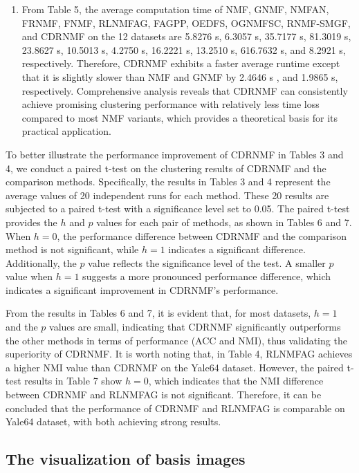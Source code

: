 \documentclass[a4paper,fleqn]{cas-sc}
\begin{document}
\begin{enumerate}[(1)]
	\item From Table 5, the average computation time of NMF, GNMF, NMFAN, FRNMF, FNMF, RLNMFAG, FAGPP, OEDFS, OGNMFSC, RNMF-SMGF, and CDRNMF on the 12 datasets are 5.8276 s, 6.3057 s, 35.7177 s, 81.3019 s, 23.8627 s, 10.5013 s, 4.2750 s, 16.2221 s, 13.2510 s, 616.7632 s, and 8.2921 s, respectively. Therefore, CDRNMF exhibits a faster average runtime except that it is slightly slower than NMF and GNMF by 2.4646 s , and 1.9865 s, respectively. Comprehensive analysis reveals that CDRNMF can consistently achieve promising clustering performance with relatively less time loss compared to most NMF variants, which provides a theoretical basis for its practical application.
\end{enumerate}

To better illustrate the performance improvement of CDRNMF in Tables 3 and 4, we conduct a paired t-test on the clustering results of CDRNMF and the comparison methods. Specifically, the results in Tables 3 and 4 represent the average values of 20 independent runs for each method. These 20 results are subjected to a paired t-test with a significance level set to 0.05. The paired t-test provides the $h$ and $p$ values for each pair of methods, as shown in Tables 6 and 7. When $h = 0$, the performance difference between CDRNMF and the comparison method is not significant, while $h = 1$ indicates a significant difference. Additionally, the $p$ value reflects the significance level of the test. A smaller $p$ value when $h = 1$ suggests a more pronounced performance difference, which indicates a significant improvement in CDRNMF's performance.

From the results in Tables 6 and 7, it is evident that, for most datasets, $h = 1$ and the $p$ values are small, indicating that CDRNMF significantly outperforms the other methods in terms of performance (ACC and NMI), thus validating the superiority of CDRNMF. It is worth noting that, in Table 4, RLNMFAG achieves a higher NMI value than CDRNMF on the Yale64 dataset. However, the paired t-test results in Table 7 show $h = 0$, which indicates that the NMI difference between CDRNMF and RLNMFAG is not significant. Therefore, it can be concluded that the performance of CDRNMF and RLNMFAG is comparable on Yale64 dataset, with both achieving strong results.

\subsection{The visualization of basis images}
\end{document}
